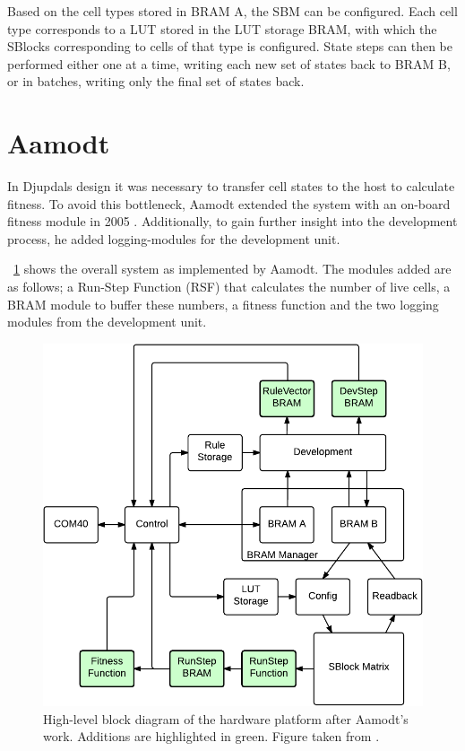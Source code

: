Based on the cell types stored in BRAM A, the SBM can be configured. Each cell
type corresponds to a LUT stored in the LUT storage BRAM, with which the SBlocks
corresponding to cells of that type is configured. State steps can then be
performed either one at a time, writing each new set of states back to BRAM B,
or in batches, writing only the final set of states back.

\section{Aamodt}

In Djupdals design it was necessary to transfer cell states to the host to
calculate fitness. To avoid this bottleneck, Aamodt extended the system with an
on-board fitness module in 2005 \cite{Aamodt2005}. Additionally, to gain further
insight into the development process, he added logging-modules for the
development unit.

\figurename~\ref{fig:overview-aamodt} shows the overall system as implemented by
Aamodt. The modules added are as follows; a Run-Step Function (RSF) that
calculates the number of live cells, a BRAM module to buffer these numbers, a
fitness function and the two logging modules from the development unit.

\begin{figure}[!ht]
    \centering
    \includegraphics[width=0.8\linewidth]{fig/overview-aamodt}
    \caption[Aamodt's hardware design]{
        High-level block diagram of the hardware platform after Aamodt's work.
        Additions are highlighted in green. Figure taken from \cite{Lundal2015a}. 
    }
    \label{fig:overview-aamodt}
\end{figure}

